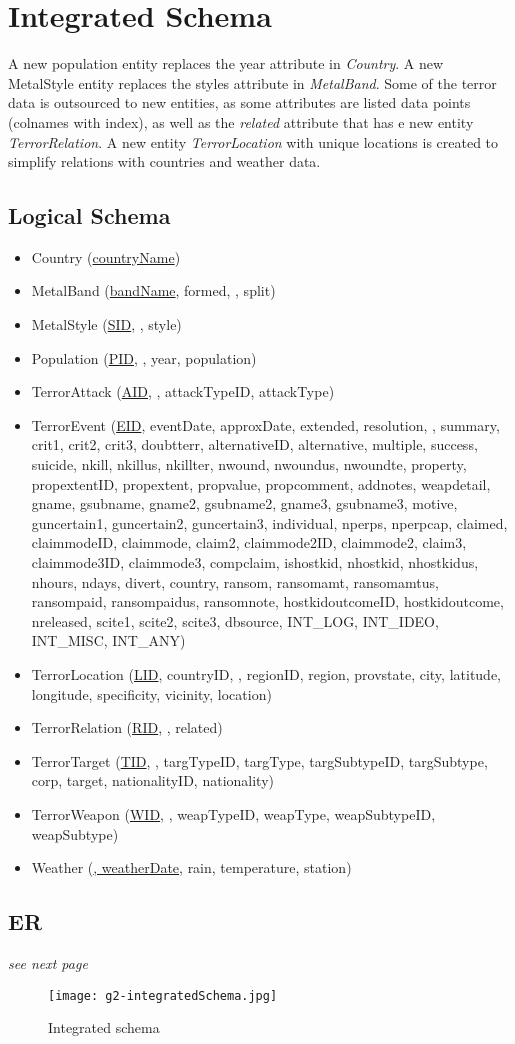 \section{Integrated Schema}
A new population entity replaces the year attribute in \emph{Country}. A new MetalStyle entity replaces the styles attribute in \emph{MetalBand}. Some of the terror data is outsourced to new entities, as some attributes are listed data points (colnames with index), as well as the \emph{related} attribute that has e new entity \emph{TerrorRelation}. A new entity \emph{TerrorLocation} with unique locations is created to simplify relations with countries and weather data.
    
\subsection{Logical Schema}
\begin{itemize}
\item Country (\underline{countryName})
\item MetalBand (\underline{bandName}, formed, , split)
\item MetalStyle (\underline{SID}, , style)
\item Population (\underline{PID}, , year, population)
\item TerrorAttack (\underline{AID}, , attackTypeID, attackType)
\item TerrorEvent (\underline{EID}, eventDate, approxDate, extended, resolution, , summary, crit1, crit2, crit3, doubtterr, alternativeID, alternative, multiple, success, suicide, nkill, nkillus, nkillter, nwound, nwoundus, nwoundte, property, propextentID, propextent, propvalue, propcomment, addnotes, weapdetail, gname, gsubname, gname2, gsubname2, gname3, gsubname3, motive, guncertain1, guncertain2, guncertain3, individual, nperps, nperpcap, claimed, claimmodeID, claimmode, claim2, claimmode2ID, claimmode2, claim3, claimmode3ID, claimmode3, compclaim, ishostkid, nhostkid, nhostkidus, nhours, ndays, divert, country, ransom, ransomamt, ransomamtus, ransompaid, ransompaidus, ransomnote, hostkidoutcomeID, hostkidoutcome, nreleased, scite1, scite2, scite3, dbsource, INT\_LOG, INT\_IDEO, INT\_MISC, INT\_ANY)
\item TerrorLocation (\underline{LID}, countryID, , regionID, region, provstate, city, latitude, longitude, specificity, vicinity, location)
\item TerrorRelation (\underline{RID}, , {related})
\item TerrorTarget (\underline{TID}, , targTypeID, targType, targSubtypeID, targSubtype, corp, target, nationalityID, nationality)
\item TerrorWeapon (\underline{WID}, , weapTypeID, weapType, weapSubtypeID, weapSubtype)
\item Weather (\underline{, weatherDate}, rain, temperature, station)
\end{itemize}

\subsection{ER}
\emph{see next page}
\begin{figure}[hbt!]
	\centering
	\texttt{[image: g2-integratedSchema.jpg]}
	\caption{Integrated schema}
\end{figure}

\newpage